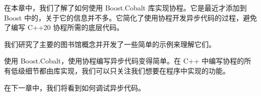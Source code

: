在本章中，我们了解了如何使用 Boost.Cobalt 库实现协程。它是最近才添加到 Boost 中的，关于它的信息并不多。它简化了使用协程开发异步代码的过程，避免了编写 C++20 协程所需的底层代码。

我们研究了主要的图书馆概念并开发了一些简单的示例来理解它们。

使用 Boost.Cobalt，使用协程编写异步代码变得简单。在 C++ 中编写协程的所有低级细节都由库实现，我们可以只关注我们想要在程序中实现的功能。

在下一章中，我们将看到如何调试异步代码。